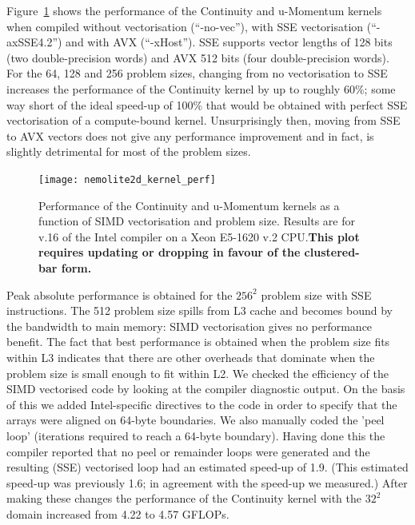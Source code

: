 \documentclass[12pt]{article}
\begin{document}
Figure~\ref{FIG_kernel_perf} shows the performance of the Continuity
and u-Momentum kernels when compiled without vectorisation
(``-no-vec''), with SSE vectorisation (``-axSSE4.2'') and with AVX
(``-xHost''). SSE supports vector lengths of 128 bits (two
double-precision words) and AVX 512 bits (four double-precision
words). For the 64, 128 and 256 problem sizes, changing from no
vectorisation to SSE increases the performance of the Continuity
kernel by up to roughly 60\%; some way short of the ideal speed-up of
100\% that would be obtained with perfect SSE vectorisation of a
compute-bound kernel. Unsurprisingly then, moving from SSE to AVX
vectors does not give any performance improvement and in fact, is
slightly detrimental for most of the problem sizes.

\begin{figure}
  \centering
  \texttt{[image: nemolite2d\_kernel\_perf]}
  \caption{Performance of the Continuity and u-Momentum kernels as a
    function of SIMD vectorisation and problem size. Results are for
    v.16 of the Intel compiler on a Xeon E5-1620 v.2 CPU.{\bf This plot
requires updating or dropping in favour of the clustered-bar form.}}
  \label{FIG_kernel_perf}
\end{figure}

Peak absolute performance is obtained for the $256^2$ problem size
with SSE instructions. The 512 problem size spills from L3 cache and
becomes bound by the bandwidth to main memory: SIMD vectorisation
gives no performance benefit. The fact that best performance is
obtained when the problem size fits within L3 indicates that there are
other overheads that dominate when the problem size is small enough to
fit within L2. We checked the efficiency of the SIMD vectorised code
by looking at the compiler diagnostic output. On the basis of this we
added Intel-specific directives to the code in order to specify that
the arrays were aligned on 64-byte boundaries. We also manually coded
the 'peel loop' (iterations required to reach a 64-byte
boundary). Having done this the compiler reported that no peel or
remainder loops were generated and the resulting (SSE) vectorised loop
had an estimated speed-up of 1.9. (This estimated speed-up was
previously 1.6; in agreement with the speed-up we measured.) After
making these changes the performance of the Continuity kernel with the
$32^2$ domain increased from 4.22 to 4.57 GFLOPs.
\end{document}
